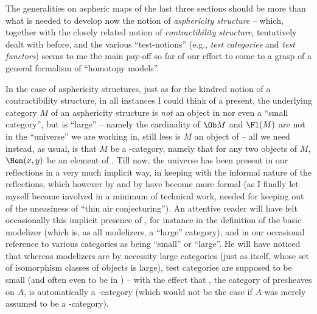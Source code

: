 \bigbreak
\presectionfill{}\par

%
\label{sec:75}%
The generalities on aspheric maps of the last three sections should be
more than what is needed to develop now the notion of
\emph{asphericity structure} -- which, together with the closely
related notion of \emph{contractibility structure}, tentatively dealt
with before, and the various ``test-notions'' (e.g., \emph{test
  categories} and \emph{test functors}) seems to me the main pay-off
so far of our effort to come to a grasp of a general formalism of
``homotopy models''.

In the case of asphericity structures, just as for the kindred notion
of a contractibility structure, in all instances I could think of a
present, the underlying category $M$ of an asphericity structure is
\emph{not} an object in \Cat{} nor even a ``small category'', but is
``large'' -- namely the cardinality of $\Ob M$ and $\Fl(M)$ are not in
the ``universe'' we are working in, still less is $M$ an object of
\scrU{} -- all we need instead, as usual, is that $M$ be a
\scrU-category, namely that for any two objects of $M$, $\Hom(x,y)$ be
an element of \scrU. Till now, the universe \scrU{} has been present
in our reflections in a very much implicit way, in keeping with the
informal nature of the reflections, which however by and by have
become more formal (as I finally let myself become involved
in a minimum of technical work, needed for keeping out of
the uneasiness of ``thin air conjecturing''). An attentive reader will
have felt occasionally this implicit presence of \scrU, for instance
in the definition of the basic modelizer \Cat{} (which is, as all
modelizers, a ``large'' category), and in our occasional reference to
various categories as being ``small'' or ``large''. He will have noticed that whereas modelizers are by necessity
large categories (just as \Hot{} itself, whose set of isomorphism
classes of objects is large), test categories are supposed to be small
(and often even to be in \Cat) -- with the effect that \Ahat, the
category of presheaves on $A$, is automatically a \scrU-category
(which would not be the case if $A$ was merely assumed to be a
\scrU-category).

